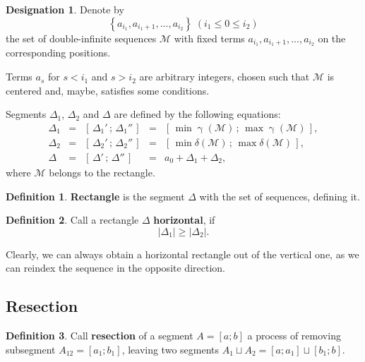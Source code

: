 \documentclass[a4paper, 12pt]{article}
\theoremstyle{definition}
\newtheorem*{definition}{Definition}
\theoremstyle{definition}
\newtheorem*{designation}{Designation}
\theoremstyle{proposition}
\theoremstyle{lemma}
\newcommand{\M}{\mathcal{M}}
\newcommand{\g}{\upgamma}
\renewcommand{\d}{\delta}
\newcommand{\D}{\Delta}
\begin{document}
\begin{designation}
	Denote by
	\begin{equation*}%
		\left\{ a_{i_1}, a_{i_1 + 1}, ..., a_{i_2} \right\}
		\;(i_1 \leqslant 0 \leqslant i_2)
	\end{equation*}
	the set of double-infinite sequences $\M$
	with fixed terms $a_{i_1}, a_{i_1 + 1}, ..., a_{i_2}$
	on the corresponding positions.
	
	Terms $a_s$ for $s < i_1$ and $s > i_2$ are arbitrary integers,
	chosen such that $\M$ is centered and, maybe, satisfies some conditions.
\end{designation}

Segments $\D_1$, $\D_2$ and $\D$
are defined by the following equations:
\begin{equation}\label{deltas}
	\begin{array}{lclcl}
		\D_1 & = & \left[\, \D_1' \,;\, \D_1'' \, \right]
		& = & \left[\, \min\g( \M) \,;\,
		\max\g( \M) \, \right],
		\\
		\D_2 & = & \left[\, \D_2' \,;\, \D_2'' \, \right]
		& = & \left[\, \min\d( \M) \,;\,
		\max\d(\M) \, \right],
		\\
		\D & = & \left[\, \D' \,;\, \D'' \, \right]
		& = & a_0 + \D_1 + \D_2,
	\end{array}
\end{equation}
where $\M$ belongs to the rectangle.

\begin{definition}
	\textbf{Rectangle} is the segment $\D$ with the set of sequences, defining it.
\end{definition}

\begin{definition}
	Call a rectangle $\D$ \textbf{horizontal}, if
	\begin{equation}
		\label{d1>d2}
		|\D_1| \geqslant |\D_2|.
	\end{equation}
\end{definition}

Clearly, we can always obtain a horizontal rectangle out of the vertical one,
as we can reindex the sequence in the opposite direction.

\subsection{Resection}

\begin{definition}
	Call \textbf{resection} of a segment $A = [a; b]$
	a process of removing subsegment $A_{12} = [a_1; b_1]$,
	leaving two segments $A_1 \sqcup A_2 = [a; a_1] \sqcup [b_1; b]$.
\end{definition}
\end{document}
